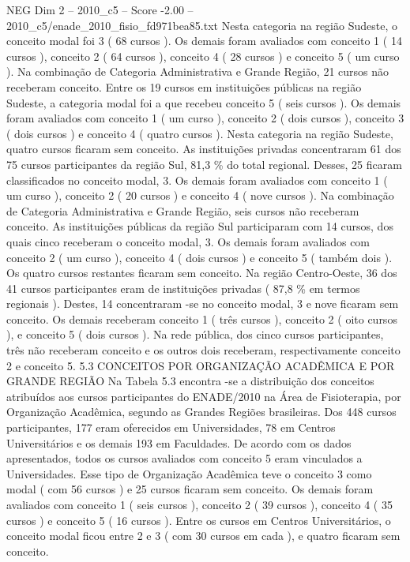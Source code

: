 \begin{textsample}{NEG Dim 2 – 2010\_c5 – Score -2.00 – 2010\_c5/enade\_2010\_fisio\_fd971bea85.txt}
Nesta categoria na região Sudeste, o conceito modal foi 3 ( 68 cursos ).
Os demais foram avaliados com conceito 1 ( 14 cursos ), conceito 2 ( 64 cursos ), conceito 4 ( 28 cursos ) e conceito 5 ( um curso ).
Na combinação de Categoria Administrativa e Grande Região, 21 cursos não receberam conceito.
Entre os 19 cursos em instituições públicas na região Sudeste, a categoria modal foi a que recebeu conceito 5 ( seis cursos ).
Os demais foram avaliados com conceito 1 ( um curso ), conceito 2 ( dois cursos ), conceito 3 ( dois cursos ) e conceito 4 ( quatro cursos ).
Nesta categoria na região Sudeste, quatro cursos ficaram sem conceito.
As instituições privadas concentraram 61 dos 75 cursos participantes da região Sul, 81,3 \% do total regional.
Desses, 25 ficaram classificados no conceito modal, 3.
Os demais foram avaliados com conceito 1 ( um curso ), conceito 2 ( 20 cursos ) e conceito 4 ( nove cursos ).
Na combinação de Categoria Administrativa e Grande Região, seis cursos não receberam conceito.
As instituições públicas da região Sul participaram com 14 cursos, dos quais cinco receberam o conceito modal, 3.
Os demais foram avaliados com conceito 2 ( um curso ), conceito 4 ( dois cursos ) e conceito 5 ( também dois ).
Os quatro cursos restantes ficaram sem conceito.
Na região Centro-Oeste, 36 dos 41 cursos participantes eram de instituições privadas ( 87,8 \% em termos regionais ).
Destes, 14 concentraram -se no conceito modal, 3 e nove ficaram sem conceito.
Os demais receberam conceito 1 ( três cursos ), conceito 2 ( oito cursos ), e conceito 5 ( dois cursos ).
Na rede pública, dos cinco cursos participantes, três não receberam conceito e os outros dois receberam, respectivamente conceito 2 e conceito 5. 5.3 CONCEITOS POR ORGANIZAÇÃO ACADÊMICA E POR GRANDE REGIÃO Na Tabela 5.3 encontra -se a distribuição dos conceitos atribuídos aos cursos participantes do ENADE/2010 na Área de Fisioterapia, por Organização Acadêmica, segundo as Grandes Regiões brasileiras.
Dos 448 cursos participantes, 177 eram oferecidos em Universidades, 78 em Centros Universitários e os demais 193 em Faculdades.
De acordo com os dados apresentados, todos os cursos avaliados com conceito 5 eram vinculados a Universidades.
Esse tipo de Organização Acadêmica teve o conceito 3 como modal ( com 56 cursos ) e 25 cursos ficaram sem conceito.
Os demais foram avaliados com conceito 1 ( seis cursos ), conceito 2 ( 39 cursos ), conceito 4 ( 35 cursos ) e conceito 5 ( 16 cursos ).
Entre os cursos em Centros Universitários, o conceito modal ficou entre 2 e 3 ( com 30 cursos em cada ), e quatro ficaram sem conceito.

\end{textsample}

